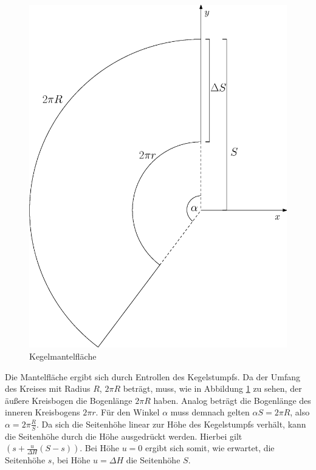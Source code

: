 \begin{figure}[!htb]
	\centering
	\includegraphics[scale=.4]{images/coneLateral.eps}
	\caption{Kegelmantelfläche}
	\label{fig:coneLateral}
\end{figure}

\FloatBarrier
Die Mantelfläche ergibt sich durch Entrollen des Kegelstumpfs. Da der Umfang des Kreises mit Radius $R$, $2\pi R$ beträgt, muss, wie in Abbildung \ref{fig:coneLateral} zu sehen, der äußere Kreisbogen die Bogenlänge $2\pi R$ haben. Analog beträgt die Bogenlänge des inneren Kreisbogens $2\pi r$. Für den Winkel $\alpha$ muss demnach gelten $\alpha S = 2\pi R$, also  $\alpha = 2\pi\frac{R}{S}$. Da sich die Seitenhöhe linear zur Höhe des Kegelstumpfs verhält, kann die Seitenhöhe durch die Höhe ausgedrückt werden. Hierbei gilt $(s + \frac{u}{\Delta H}(S-s))$. Bei Höhe $u = 0$ ergibt sich somit, wie erwartet, die Seitenhöhe $s$, bei Höhe $u = \Delta H$ die Seitenhöhe $S$.

